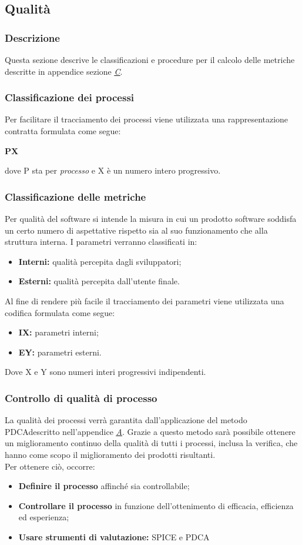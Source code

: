 	\subsection{Qualità}
\subsubsection{Descrizione}
    Questa sezione descrive le classificazioni e procedure per il calcolo delle metriche descritte in appendice sezione \hyperref[C]{\textit{\underline{C}}}.
\subsubsection{Classificazione dei processi}
	    Per facilitare il tracciamento dei processi viene utilizzata una rappresentazione contratta formulata come segue:
	    \begin{center}
	    	\textbf{PX}
	    \end{center}
	    dove P sta per \textit{processo} e X è un numero intero progressivo.
\subsubsection{Classificazione delle metriche}
Per qualità del software si intende la misura in cui un prodotto software soddisfa un certo numero di aspettative rispetto sia al suo funzionamento che alla struttura interna. I parametri verranno classificati in:
\begin{itemize}
    \item{\textbf{Interni:} qualità percepita dagli sviluppatori;}
    \item{\textbf{Esterni:} qualità percepita dall'utente finale.}
\end{itemize}
Al fine di rendere più facile il tracciamento dei parametri viene utilizzata una codifica formulata come segue:
\begin{itemize}
    \item{\textbf{IX:} parametri interni;}
    \item{\textbf{EY:} parametri esterni.}
\end{itemize}
Dove X e Y sono numeri interi progressivi indipendenti.
\subsubsection{Controllo di qualità di processo}
La qualità dei processi verrà garantita dall'applicazione del metodo PDCA\pedice descritto nell'appendice \hyperref[A]{\textit{\underline{A}}}. Grazie a questo metodo sarà possibile ottenere un miglioramento continuo della qualità di tutti i processi, inclusa la verifica, che hanno come scopo il miglioramento dei prodotti risultanti.\\
Per ottenere ciò, occorre:
\begin{itemize}
\item \textbf{Definire il processo} affinché sia controllabile;
\item \textbf{Controllare il processo} in funzione dell'ottenimento di efficacia, efficienza ed esperienza;
\item \textbf{Usare strumenti di valutazione:} SPICE e PDCA
\end{itemize}

